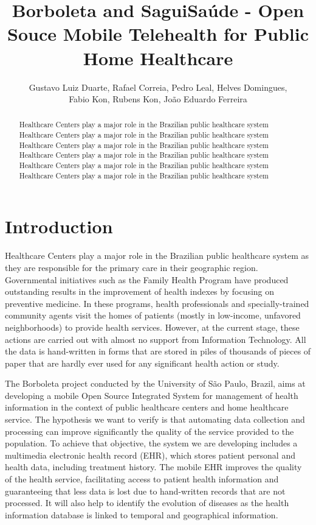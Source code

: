 \documentclass[12pt]{article}
\title{Borboleta and SaguiSaúde - Open Souce Mobile Telehealth for Public Home Healthcare}
\author{Gustavo Luiz Duarte, Rafael Correia, Pedro Leal, Helves Domingues, \\
		Fabio Kon, Rubens Kon, João Eduardo Ferreira}
\begin{document}
\maketitle

\begin{abstract}
   	Healthcare Centers play a major role in the Brazilian public healthcare system
	Healthcare Centers play a major role in the Brazilian public healthcare system
	Healthcare Centers play a major role in the Brazilian public healthcare system
	Healthcare Centers play a major role in the Brazilian public healthcare system
	Healthcare Centers play a major role in the Brazilian public healthcare system
	Healthcare Centers play a major role in the Brazilian public healthcare system
\end{abstract}

\section{Introduction}

Healthcare Centers play a major role in the Brazilian public healthcare system as they are responsible for the primary care in their geographic region. Governmental initiatives such as the Family Health Program have produced outstanding results in the improvement of health indexes by focusing on preventive medicine. In these programs, health professionals and specially-trained community agents visit the homes of patients (mostly in low-income, unfavored neighborhoods) to provide health services. However, at the current stage, these actions are carried out with almost no support from Information Technology. All the data is hand-written in forms that are stored in piles of thousands of pieces of paper that are hardly ever used for any significant health action or study.

The Borboleta project conducted by the University of São Paulo, Brazil, aims at developing a mobile Open Source Integrated System for management of health information in the context of public healthcare centers and home healthcare service. The hypothesis we want to verify is that automating data collection and processing can improve significantly the quality of the service provided to the population. To achieve that objective, the system we are developing includes a multimedia electronic health record (EHR), which stores patient personal and health data, including treatment history. The mobile EHR improves the quality of the health service, facilitating access to patient health information and guaranteeing that less data is lost due to hand-written records that are not processed. It will also help to identify the evolution of diseases as the health information database is linked to temporal and geographical information.
\end{document}
